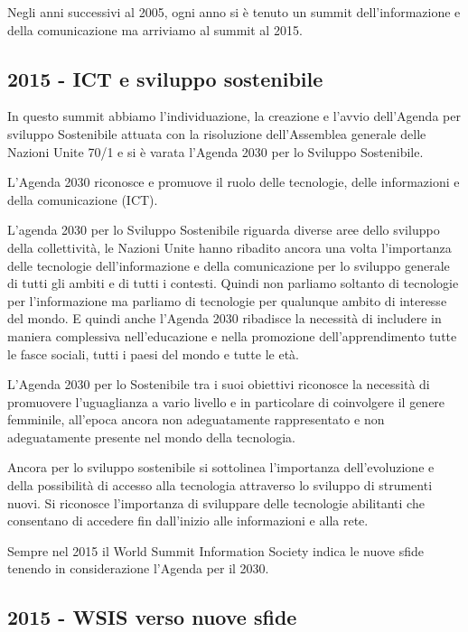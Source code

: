 Negli anni successivi al 2005, ogni anno si è tenuto un summit dell'informazione e della comunicazione ma arriviamo al summit al 2015.

\subsection{2015 - ICT e sviluppo sostenibile}

In questo summit abbiamo l'individuazione, la creazione e l'avvio dell'Agenda per sviluppo Sostenibile attuata con la risoluzione dell'Assemblea generale delle Nazioni Unite 70/1 e si è varata l'Agenda 2030 per lo Sviluppo Sostenibile. 

L'Agenda 2030 riconosce e promuove il ruolo delle tecnologie, delle informazioni e della comunicazione (ICT).

L'agenda 2030 per lo Sviluppo Sostenibile riguarda diverse aree dello sviluppo della collettività, le Nazioni Unite hanno ribadito ancora una volta l'importanza delle tecnologie dell'informazione e della comunicazione per lo sviluppo generale di tutti gli ambiti e di tutti i contesti. Quindi non parliamo soltanto di tecnologie per l'informazione ma parliamo di tecnologie per qualunque ambito di interesse del mondo. E quindi anche l'Agenda 2030 ribadisce la necessità di includere in maniera complessiva nell'educazione e nella promozione dell'apprendimento tutte le fasce sociali, tutti i paesi del mondo e tutte le età.

L'Agenda 2030 per lo Sostenibile tra i suoi obiettivi riconosce la necessità di promuovere l'uguaglianza a vario livello e in particolare di coinvolgere il genere femminile, all'epoca ancora non adeguatamente rappresentato e non adeguatamente presente nel mondo della tecnologia.

Ancora per lo sviluppo sostenibile si sottolinea l'importanza dell'evoluzione e della possibilità di accesso alla tecnologia attraverso lo sviluppo di strumenti nuovi. Si riconosce l'importanza di sviluppare delle tecnologie abilitanti che consentano di accedere fin dall'inizio alle informazioni e alla rete. 

Sempre nel 2015 il World Summit Information Society indica le nuove sfide tenendo in considerazione l'Agenda per il 2030.

\subsection{2015 - WSIS verso nuove sfide}

